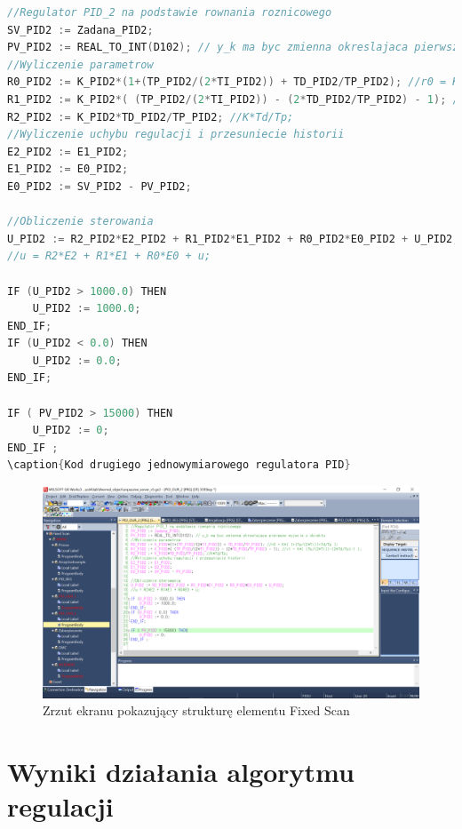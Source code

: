 \begin{lstlisting}[caption={Kod drugiego jednowymiarowego regulatora PID}, language=C]
//Regulator PID_2 na podstawie rownania roznicowego
SV_PID2 := Zadana_PID2;
PV_PID2 := REAL_TO_INT(D102); // y_k ma byc zmienna okreslajaca pierwsze wyjscie z obiektu 
//Wyliczenie parametrow
R0_PID2 := K_PID2*(1+(TP_PID2/(2*TI_PID2)) + TD_PID2/TP_PID2); //r0 = K*( 1+(Tp/(2*Ti))+Td/Tp );
R1_PID2 := K_PID2*( (TP_PID2/(2*TI_PID2)) - (2*TD_PID2/TP_PID2) - 1); //r1 = K*( (Tp/(2*Ti))-(2*Td/Tp)-1 );
R2_PID2 := K_PID2*TD_PID2/TP_PID2; //K*Td/Tp;
//Wyliczenie uchybu regulacji i przesuniecie historii
E2_PID2 := E1_PID2;
E1_PID2 := E0_PID2;
E0_PID2 := SV_PID2 - PV_PID2;

//Obliczenie sterowania
U_PID2 := R2_PID2*E2_PID2 + R1_PID2*E1_PID2 + R0_PID2*E0_PID2 + U_PID2;
//u = R2*E2 + R1*E1 + R0*E0 + u;

IF (U_PID2 > 1000.0) THEN
	U_PID2 := 1000.0;
END_IF;
IF (U_PID2 < 0.0) THEN
	U_PID2 := 0.0;
END_IF;

IF ( PV_PID2 > 15000) THEN
	U_PID2 := 0;
END_IF ;
\caption{Kod drugiego jednowymiarowego regulatora PID}
\end{lstlisting}

\begin{figure}[H]
\setlength{\leftskip}{-1.5cm}
\includegraphics[scale=0.43]{sections/thermal/DrzewkoZFolderami.png}
\caption{Zrzut ekranu pokazujący strukturę elementu Fixed Scan}
\end{figure}


\section{Wyniki działania algorytmu regulacji}
\label{thermal_pid_wyniki}

